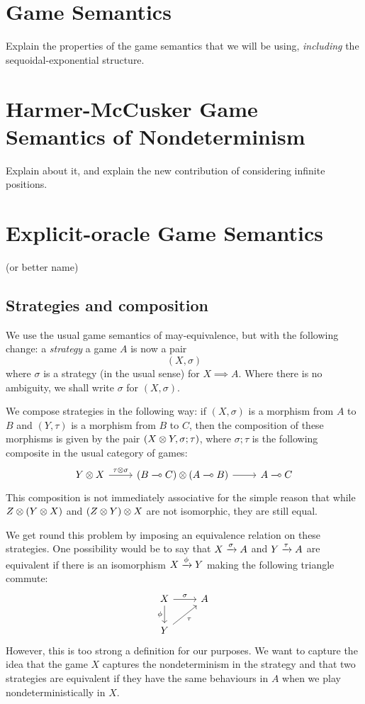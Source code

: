 \documentclass{article}
\begin{document}
\section{Game Semantics}

Explain the properties of the game semantics that we will be using, \emph{including} the sequoidal-exponential structure.

\section{Harmer-McCusker Game Semantics of Nondeterminism}

Explain about it, and explain the new contribution of considering infinite positions.

\section{Explicit-oracle Game Semantics}

(or better name)

\subsection{Strategies and composition}

We use the usual game semantics of may-equivalence, but with the following change: a \emph{strategy} a game $A$ is now a pair
\[
  (X, \sigma)
  \]
where $\sigma$ is a strategy (in the usual sense) for $X\implies A$.  
Where there is no ambiguity, we shall write $\sigma$ for $(X,\sigma)$.

We compose strategies in the following way: if $(X,\sigma)$ is a morphism from $A$ to $B$ and $(Y,\tau)$ is a morphism from $B$ to $C$, then the composition of these morphisms is given by the pair $(X\otimes Y, \sigma;\tau)$, where $\sigma;\tau$ is the following composite in the usual category of games:
\[
  \begin{tikzcd}
    Y \tensor X \arrow[r, "\tau\tensor\sigma"]
      & (B \implies C) \tensor (A \implies B) \arrow[r]
        & A \implies C
  \end{tikzcd}
  \]
This composition is not immediately associative for the simple reason that while $Z \otimes (Y\otimes X)$ and $(Z \otimes Y)\otimes X$ are not isomorphic, they are still equal.  

We get round this problem by imposing an equivalence relation on these strategies.  
One possibility would be to say that $X\xrightarrow{\sigma} A$ and $Y\xrightarrow{\tau} A$ are equivalent if there is an isomorphism $X\xrightarrow{\phi} Y$ making the following triangle commute:
\[
  \begin{tikzcd}
    X \arrow[r, "\sigma"] \arrow[d, "\phi"']
      & A \\
    Y \arrow[ur, "\tau"']
      &
  \end{tikzcd}
  \]
However, this is too strong a definition for our purposes.  
We want to capture the idea that the game $X$ captures the nondeterminism in the strategy and that two strategies are equivalent if they have the same behaviours in $A$ when we play nondeterministically in $X$.  
\end{document}

